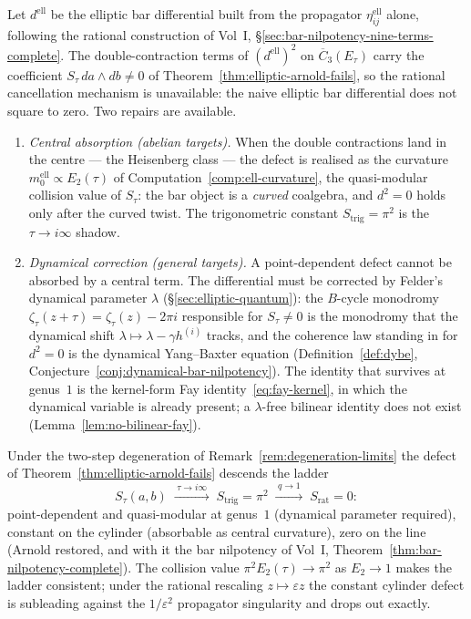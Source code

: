 \begin{corollary}\label{cor:elliptic-bar-dynamical}
Let $d^{\mathrm{ell}}$ be the elliptic bar differential built from
the propagator $\eta^{\mathrm{ell}}_{ij}$ alone, following the
rational construction of
Vol~I, \S\ref{sec:bar-nilpotency-nine-terms-complete}. The
double-contraction terms of $(d^{\mathrm{ell}})^2$ on
$\overline{C}_3(E_\tau)$ carry the coefficient
$S_\tau\, da \wedge db \neq 0$ of
Theorem~\ref{thm:elliptic-arnold-fails}, so the rational cancellation
mechanism is unavailable: the naive elliptic bar differential does
not square to zero. Two repairs are available.
\begin{enumerate}[label=\textup{(\roman*)}]
\item \emph{Central absorption (abelian targets).} When the double
contractions land in the centre --- the Heisenberg class --- the
defect is realised as the curvature $m_0^{\mathrm{ell}} \propto
E_2(\tau)$ of Computation~\ref{comp:ell-curvature}, the quasi-modular
collision value of $S_\tau$: the bar object is a \emph{curved}
coalgebra, and $d^2 = 0$ holds only after the curved twist. The
trigonometric constant $S_{\mathrm{trig}} = \pi^2$ is the
$\tau \to i\infty$ shadow.
\item \emph{Dynamical correction (general targets).} A
point-dependent defect cannot be absorbed by a central term. The
differential must be corrected by Felder's dynamical parameter
$\lambda$ (\S\ref{sec:elliptic-quantum}): the $B$-cycle monodromy
$\zeta_\tau(z+\tau) = \zeta_\tau(z) - 2\pi i$ responsible for
$S_\tau \neq 0$ is the monodromy that the dynamical shift
$\lambda \mapsto \lambda - \gamma h^{(i)}$ tracks, and the coherence
law standing in for $d^2 = 0$ is the dynamical Yang--Baxter equation
(Definition~\ref{def:dybe},
Conjecture~\ref{conj:dynamical-bar-nilpotency}). The identity that
survives at genus~$1$ is the kernel-form Fay
identity~\eqref{eq:fay-kernel}, in which the dynamical variable is
already present; a $\lambda$-free bilinear identity does not exist
(Lemma~\ref{lem:no-bilinear-fay}).
\end{enumerate}
\end{corollary}

\begin{remark}\label{rem:fay-to-arnold}
Under the two-step degeneration of
Remark~\ref{rem:degeneration-limits} the defect of
Theorem~\ref{thm:elliptic-arnold-fails} descends the ladder
\[
S_\tau(a,b) \;\xrightarrow{\;\tau \to i\infty\;}\;
S_{\mathrm{trig}} = \pi^2 \;\xrightarrow{\;q \to 1\;}\;
S_{\mathrm{rat}} = 0 :
\]
point-dependent and quasi-modular at genus~$1$ (dynamical parameter
required), constant on the cylinder (absorbable as central
curvature), zero on the line (Arnold restored, and with it the bar
nilpotency of Vol~I, Theorem~\ref{thm:bar-nilpotency-complete}).
The collision value $\pi^2 E_2(\tau) \to \pi^2$ as $E_2 \to 1$ makes
the ladder consistent; under the rational rescaling
$z \mapsto \varepsilon z$ the constant cylinder defect is subleading
against the $1/\varepsilon^2$ propagator singularity and drops out
exactly.
\end{remark}


